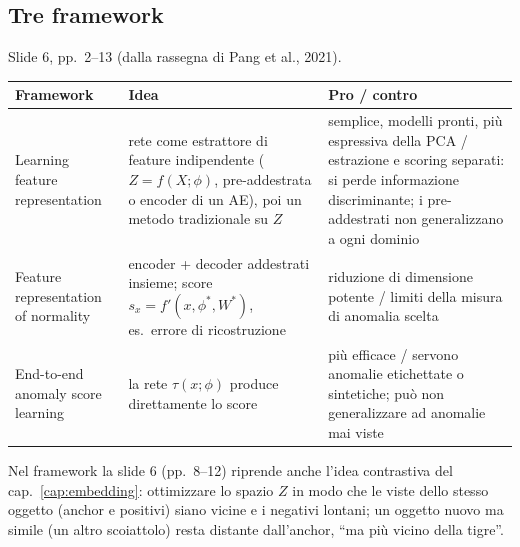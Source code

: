 \subsection{Tre framework}
Slide 6, pp.\ 2--13 (dalla rassegna di Pang et al., 2021).
\begin{center}
\small
\begin{tabularx}{\linewidth}{@{}l X X@{}}
\toprule
\textbf{Framework} & \textbf{Idea} & \textbf{Pro / contro}\\
\midrule
Learning feature representation & rete come estrattore di feature indipendente ($Z=f(X;\phi)$, pre-addestrata o encoder di un AE), poi un
metodo tradizionale su $Z$ & semplice, modelli pronti, più espressiva della PCA / estrazione e scoring separati: si perde informazione
discriminante; i pre-addestrati non generalizzano a ogni dominio\\
Feature representation of normality & encoder + decoder addestrati insieme; score $s_x = f'(x, \phi^*, W^*)$, es.\ errore di ricostruzione &
riduzione di dimensione potente / limiti della misura di anomalia scelta\\
End-to-end anomaly score learning & la rete $\tau(x;\phi)$ produce direttamente lo score & più efficace / servono anomalie etichettate
o sintetiche; può non generalizzare ad anomalie mai viste\\
\bottomrule
\end{tabularx}
\end{center}
Nel framework  la slide 6 (pp.\ 8--12) riprende anche l'idea contrastiva del cap.~\ref{cap:embedding}:
ottimizzare lo spazio $Z$ in modo che le viste dello stesso oggetto (anchor e positivi) siano vicine e i negativi lontani; un oggetto nuovo
ma simile (un altro scoiattolo) resta distante dall'anchor, ``ma più vicino della tigre''.

